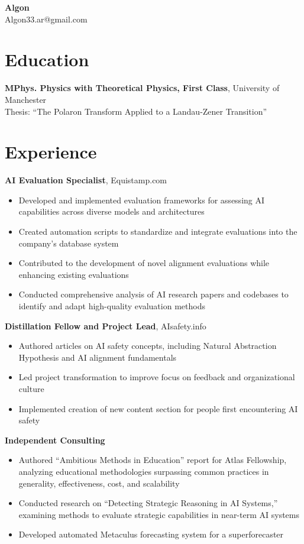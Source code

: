 \documentclass{article}
\begin{document}
\vspace*{-40pt}
\begin{center}
\huge\textbf{Algon}\\[3pt]
\small Algon33.ar@gmail.com
\end{center}

\vspace{6pt}

\section*{Education}
\textbf{MPhys. Physics with Theoretical Physics, First Class}, University of Manchester\\
Thesis: ``The Polaron Transform Applied to a Landau-Zener Transition''

\section*{Experience}
\textbf{AI Evaluation Specialist}, Equistamp.com
\begin{itemize}[leftmargin=*]
\item Developed and implemented evaluation frameworks for assessing AI capabilities across diverse models and architectures
\item Created automation scripts to standardize and integrate evaluations into the company's database system
\item Contributed to the development of novel alignment evaluations while enhancing existing evaluations
\item Conducted comprehensive analysis of AI research papers and codebases to identify and adapt high-quality evaluation methods
\end{itemize}

\textbf{Distillation Fellow and Project Lead}, AIsafety.info
\begin{itemize}[leftmargin=*]
\item Authored articles on AI safety concepts, including Natural Abstraction Hypothesis and AI alignment fundamentals
\item Led project transformation to improve focus on feedback and organizational culture
\item Implemented creation of new content section for people first encountering AI safety
\end{itemize}

\textbf{Independent Consulting}
\begin{itemize}[leftmargin=*]
\item Authored ``Ambitious Methods in Education'' report for Atlas Fellowship, analyzing educational methodologies surpassing common practices in generality, effectiveness, cost, and scalability
\item Conducted research on ``Detecting Strategic Reasoning in AI Systems,'' examining methods to evaluate strategic capabilities in near-term AI systems
\item Developed automated Metaculus forecasting system for a superforecaster
\end{itemize}
\end{document}
